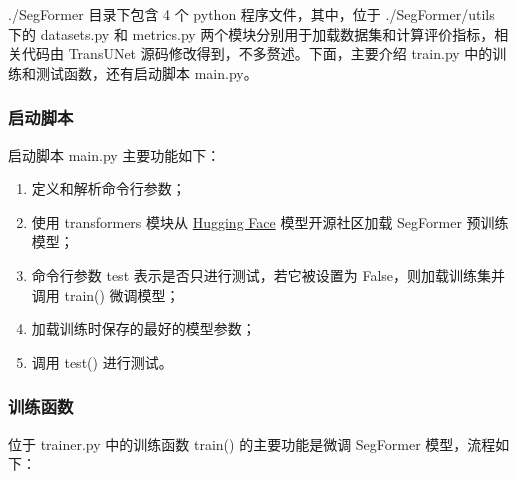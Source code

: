 \documentclass[hyperref,a4paper,UTF8]{ctexart}
\begin{document}
./SegFormer 目录下包含 4 个 python 程序文件，其中，位于 ./SegFormer/utils 下的 datasets.py 和 metrics.py 两个模块分别用于加载数据集和计算评价指标，相关代码由 TransUNet 源码修改得到，不多赘述。下面，主要介绍 train.py 中的训练和测试函数，还有启动脚本 main.py。

\subsubsection{启动脚本}

启动脚本 main.py 主要功能如下：

\begin{enumerate}[itemsep=2pt,topsep=0pt,parsep=0pt]
    \item 定义和解析命令行参数；
    \item 使用 transformers 模块从 \href{https://huggingface.co/}{Hugging Face} 模型开源社区加载 SegFormer 预训练模型；
    \item 命令行参数 test 表示是否只进行测试，若它被设置为 False，则加载训练集并调用 train() 微调模型；
    \item 加载训练时保存的最好的模型参数；
    \item 调用 test() 进行测试。
\end{enumerate}

\subsubsection{训练函数}

位于 trainer.py 中的训练函数 train() 的主要功能是微调 SegFormer 模型，流程如下：
\end{document}
